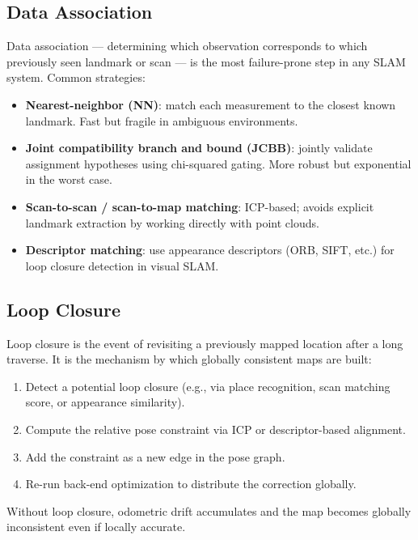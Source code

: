 \documentclass[11pt,a4paper]{article}
\theoremstyle{definition}
\theoremstyle{plain}
\theoremstyle{remark}
\begin{document}
\subsection{Data Association}

Data association --- determining which observation corresponds to which previously seen landmark or scan --- is the most failure-prone step in any SLAM system. Common strategies:

\begin{itemize}
    \item \textbf{Nearest-neighbor (NN)}: match each measurement to the closest known landmark. Fast but fragile in ambiguous environments.
    \item \textbf{Joint compatibility branch and bound (JCBB)}: jointly validate assignment hypotheses using chi-squared gating. More robust but exponential in the worst case.
    \item \textbf{Scan-to-scan / scan-to-map matching}: ICP-based; avoids explicit landmark extraction by working directly with point clouds.
    \item \textbf{Descriptor matching}: use appearance descriptors (ORB, SIFT, etc.) for loop closure detection in visual SLAM.
\end{itemize}

\subsection{Loop Closure}

Loop closure is the event of revisiting a previously mapped location after a long traverse. It is the mechanism by which globally consistent maps are built:

\begin{enumerate}
    \item Detect a potential loop closure (e.g., via place recognition, scan matching score, or appearance similarity).
    \item Compute the relative pose constraint via ICP or descriptor-based alignment.
    \item Add the constraint as a new edge in the pose graph.
    \item Re-run back-end optimization to distribute the correction globally.
\end{enumerate}

Without loop closure, odometric drift accumulates and the map becomes globally inconsistent even if locally accurate.

\end{document}
